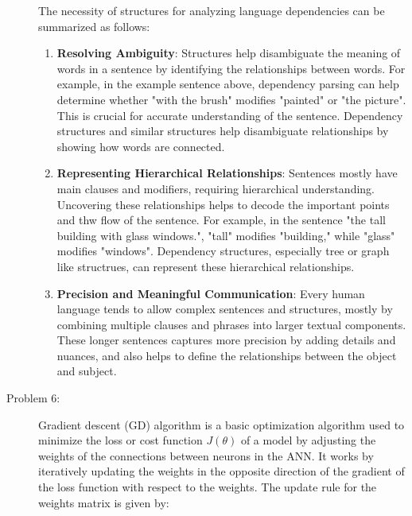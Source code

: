\documentclass[12pt]{article}
\begin{document}
\begin{description}
  The necessity of structures for analyzing language dependencies can be summarized as follows:

  \begin{enumerate}
    \item \textbf{Resolving Ambiguity}: Structures help disambiguate the meaning of words in a sentence by identifying the relationships between words. For example, in the example
    sentence above, dependency parsing can help determine whether "with the brush" modifies "painted" or "the picture". This is crucial for accurate understanding of the sentence.
    Dependency structures and similar structures help disambiguate relationships by showing how words are connected.

    \item \textbf{Representing Hierarchical Relationships}: Sentences mostly have main clauses and modifiers, requiring hierarchical understanding. Uncovering these relationships
    helps to decode the important points and thw flow of the sentence. For example, in the sentence "the tall building with glass windows.", "tall" modifies "building," while "glass" 
    modifies "windows". Dependency structures, especially tree or graph like structrues, can represent these hierarchical relationships.

    \item \textbf{Precision and Meaningful Communication}: Every human language tends to allow complex sentences and structures, mostly by combining multiple clauses and phrases
    into larger textual components. These longer sentences captures more precision by adding details and nuances, and also helps to define the relationships between the object and subject.
    
  \end{enumerate}

  \pagebreak

  \item[Problem 6:] \hfill %
  
  Gradient descent (GD) algorithm is a basic optimization algorithm used to minimize the loss or cost function $J(\theta)$ of a model by adjusting the weights of the connections between neurons in the ANN.
  It works by iteratively updating the weights in the opposite direction of the gradient of the loss function with respect to the weights. The update rule for the weights matrix is given by:


\end{description}
\end{document}

